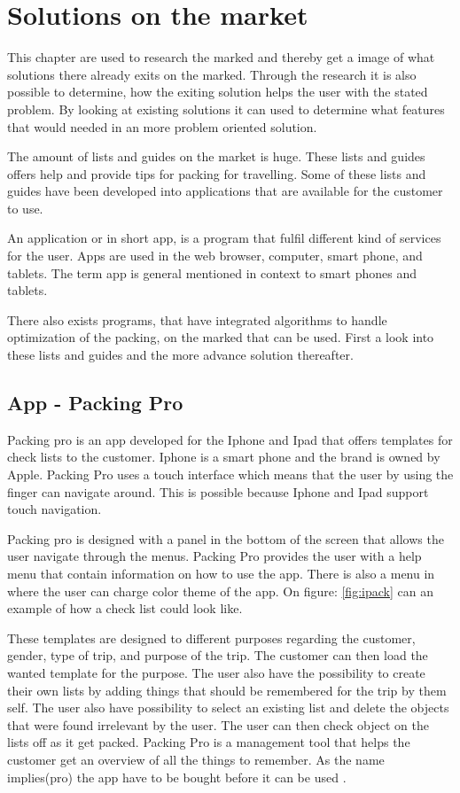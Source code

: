 \section{Solutions on the market}
\label{sec:Solution}
This chapter are used to research the marked and thereby get a image of what solutions there already exits on the marked. Through the research it is also possible to determine, how the exiting solution helps the user with the stated problem. By looking at existing solutions it can used to determine what features that would needed in an more problem oriented solution.

The amount of lists and guides on the market is huge. These lists and guides offers help and provide tips for packing for travelling. Some of these lists and guides have been developed into applications that are available for the customer to use.

An application or in short app, is a program that fulfil different kind of services for the user. Apps are used in the web browser, computer, smart phone, and tablets. The term app is general mentioned in context to smart phones and tablets.

There also exists programs, that have integrated algorithms to handle optimization of the packing, on the marked that can be used.
First a look into these lists and guides and the more advance solution thereafter.

\subsection*{App - Packing Pro}

Packing pro is an app developed for the Iphone and Ipad that offers templates for check lists to the customer. Iphone is a smart phone and the brand is owned by Apple. Packing Pro uses a touch interface which means that the user by using the finger can navigate around. This is possible because Iphone and Ipad support touch navigation.

Packing pro is designed with a panel in the bottom of the screen that allows the user navigate through the menus. Packing Pro provides the user with a help menu that contain information on how to use the app. There is also a menu in where the user can charge color theme of the app. On figure: \ref{fig:ipack} can an example of how a check list could look like.


These templates are designed to different purposes regarding the customer, gender, type of trip, and purpose of the trip.
The customer can then load the wanted template for the purpose. The user also have the possibility to create their own lists by adding things that should be remembered for the trip by them self. The user also have possibility to select an existing list and delete the objects that were found irrelevant by the user. The user can then check object on the lists off as it get packed. Packing Pro is a management tool that helps the customer get an overview of all the things to remember. As the name implies(pro) the app have to be bought before it can be used  \citep{packingpro}.

